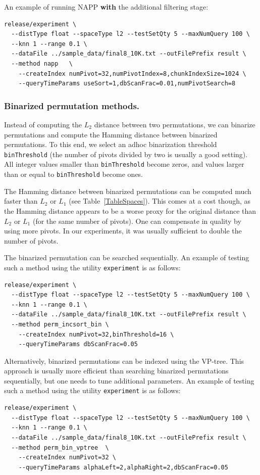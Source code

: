 \documentclass[runningheads,a4paper]{llncs}
\begin{document}
An example of running NAPP \textbf{with} the additional filtering stage:
{
\footnotesize
\begin{verbatim}
release/experiment \
  --distType float --spaceType l2 --testSetQty 5 --maxNumQuery 100 \
  --knn 1 --range 0.1 \
  --dataFile ../sample_data/final8_10K.txt --outFilePrefix result \
  --method napp   \
    --createIndex numPivot=32,numPivotIndex=8,chunkIndexSize=1024 \
    --queryTimeParams useSort=1,dbScanFrac=0.01,numPivotSearch=8
\end{verbatim}
}

\subsubsection{Binarized permutation methods.}\label{SectionPermBinary}
Instead of computing the $L_2$ distance between two permutations,
we can binarize permutations and compute the Hamming distance between
binarized permutations. 
To this end, we select an adhoc binarization threshold \texttt{binThreshold} (the
number of pivots divided by two is usually a good setting).
All integer values smaller than \texttt{binThreshold} become zeros,
and values larger than or equal to \texttt{binThreshold} become ones.

The Hamming distance between binarized permutations can be computed much faster than $L_2$ or $L_1$ (see Table~\ref{TableSpaces}). This comes at a cost though, as the Hamming distance appears to be a worse proxy for the original distance than $L_2$ or $L_1$ (for the same
number of pivots).
One can compensate in quality by using more pivots. In our experiments,
it was usually sufficient to double the number of pivots.

\newpage
The binarized permutation can be searched sequentially. 
An example of testing such a method using the utility \texttt{experiment} is as follows:
{
\footnotesize
\begin{verbatim}
release/experiment \
  --distType float --spaceType l2 --testSetQty 5 --maxNumQuery 100 \
  --knn 1 --range 0.1 \
  --dataFile ../sample_data/final8_10K.txt --outFilePrefix result \
  --method perm_incsort_bin \
    --createIndex numPivot=32,binThreshold=16 \
    --queryTimeParams dbScanFrac=0.05
\end{verbatim}
}

Alternatively, binarized permutations can be indexed using the VP-tree.
This approach is usually more efficient than searching binarized permutations sequentially,
 but one needs to tune additional parameters.
An example of testing such a method using the utility \texttt{experiment} is as follows:
{
\footnotesize
\begin{verbatim}
release/experiment \
  --distType float --spaceType l2 --testSetQty 5 --maxNumQuery 100 \
  --knn 1 --range 0.1 \
  --dataFile ../sample_data/final8_10K.txt --outFilePrefix result \
  --method perm_bin_vptree  \
    --createIndex numPivot=32 \
    --queryTimeParams alphaLeft=2,alphaRight=2,dbScanFrac=0.05
\end{verbatim}
}
\end{document}
